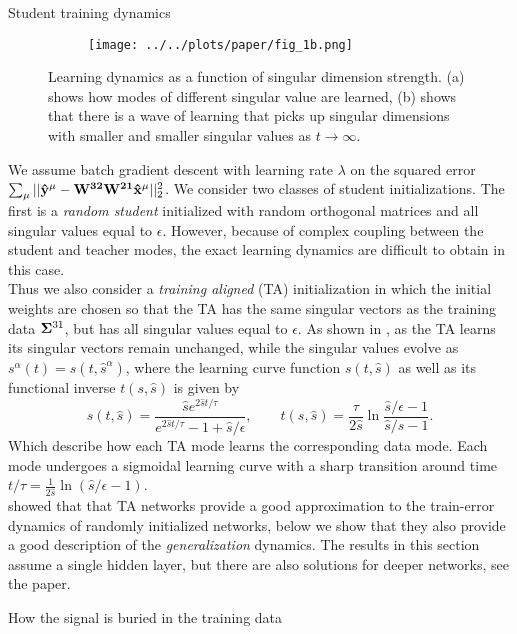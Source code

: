 \documentclass[final]{beamer}
\newcommand{\bh}[1]{{\bf\hat{#1}}}
\newcommand{\wa}{{\bf{W}^{21}}}
\newcommand{\wb}{{\bf{W}^{32}}}
\begin{document}
\begin{frame}[t]{}
\begin{columns}
\begin{column}[t]{0.248\textwidth}
\begin{block}{\large Student training dynamics}
\begin{figure}[H]
\begin{subfigure}[t]{0.35\textwidth}
\texttt{[image: ../../plots/paper/fig\_1b.png]}
\label{s_of_t_b}
\end{subfigure}
\vspace{-1em}
\caption{Learning dynamics as a function of singular dimension strength. (a) shows how modes of different singular value are learned, (b) shows that there is a wave of learning that picks up singular dimensions with smaller and smaller singular values as \(t \rightarrow \infty\).}
\vspace{-0.5em}
\end{figure}
We assume batch gradient descent with learning rate $\lambda$ on the squared error $\sum_{\mu}||\bh{y}^\mu - \wb\wa \bh{x}^\mu||_2^2$. We consider two classes of student initializations.  The first is a {\it random student} initialized with random orthogonal matrices and all singular values equal to $\epsilon$. However, because of complex coupling between the student and teacher modes, the exact learning dynamics are difficult to obtain in this case. \\[0.5em]
Thus we also consider a {\it training aligned} (TA) initialization in which the initial weights are chosen so that the TA has the same singular vectors as the training data ${\bf \Sigma}^{31}$, but has all singular values equal to $\epsilon$.  As shown in \citep{Saxe2013}, as the TA learns its singular vectors remain unchanged, while the singular values evolve as $s^\alpha(t) = s(t,\hat s^\alpha)$, where the learning curve function $s(t,\hat s)$ as well as its functional inverse $t(s,\hat s)$ is given by 
\begin{equation}
s(t,\hat s)=\frac{\hat s e^{2\hat st/\tau}}{e^{2\hat st/\tau}-1+\hat s/\epsilon}, \qquad
t(s,\hat s) = \frac{\tau}{2\hat s} 
   \ln{\frac{{\hat s}/\epsilon -1}{{\hat s}/s -1}}.
\label{s_soln}
\end{equation}
Which describe how each TA mode learns the corresponding data mode. Each mode undergoes a sigmoidal learning curve with a sharp transition around time $t/\tau = \frac{1}{2\hat s}  \ln{({\hat s}/\epsilon -1)}$. \\[0.5em] 
\citet{Saxe2013} showed that that TA networks provide a good approximation to the train-error dynamics of randomly initialized networks, below we show that they also provide a good description of the \emph{generalization} dynamics. The results in this section assume a single hidden layer, but there are also solutions for deeper networks, see the paper.
\end{block}
\begin{block}{\large How the signal is buried in the training data}

\end{block}
\end{column}
\end{columns}
\end{frame}
\end{document}
